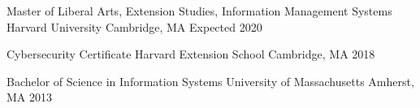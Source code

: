 
\begin{cventries}
  \cventry
    {Master of Liberal Arts, Extension Studies, Information Management Systems} %
    {Harvard University} %
    {Cambridge, MA} %
    {Expected 2020} %
    {}

  \cventry
    {Cybersecurity Certificate} %
    {Harvard Extension School} %
    {Cambridge, MA} %
    {2018} %
    {}

  \cventry
    {Bachelor of Science in Information Systems} %
    {University of Massachusetts} %
    {Amherst, MA} %
    {2013} %
    {}
  
\end{cventries}
